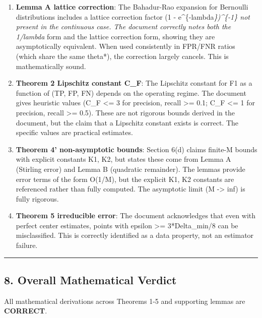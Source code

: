 \documentclass[
  12pt,
]{article}
\begin{document}
\begin{enumerate}
\def\labelenumi{\arabic{enumi}.}
\item
  \textbf{Lemma A lattice correction}: The Bahadur-Rao expansion for
  Bernoulli distributions includes a lattice correction factor (1 -
  e\^{}\{-lambda\emph{\})\^{}\{-1\} not present in the continuous case.
  The document correctly notes both the 1/lambda} form and the lattice
  correction form, showing they are asymptotically equivalent. When used
  consistently in FPR/FNR ratios (which share the same theta*), the
  correction largely cancels. This is mathematically sound.
\item
  \textbf{Theorem 2 Lipschitz constant C\_F}: The Lipschitz constant for
  F1 as a function of (TP, FP, FN) depends on the operating regime. The
  document gives heuristic values (C\_F \textless= 3 for precision,
  recall \textgreater= 0.1; C\_F \textless= 1 for precision, recall
  \textgreater= 0.5). These are not rigorous bounds derived in the
  document, but the claim that a Lipschitz constant exists is correct.
  The specific values are practical estimates.
\item
  \textbf{Theorem 4' non-asymptotic bounds}: Section 6(d) claims
  finite-M bounds with explicit constants K1, K2, but states these come
  from Lemma A (Stirling error) and Lemma B (quadratic remainder). The
  lemmas provide error terms of the form O(1/M), but the explicit K1, K2
  constants are referenced rather than fully computed. The asymptotic
  limit (M -\textgreater{} inf) is fully rigorous.
\item
  \textbf{Theorem 5 irreducible error}: The document acknowledges that
  even with perfect center estimates, points with
  \textbar\textbar epsilon\textbar\textbar{} \textgreater=
  3*Delta\_min/8 can be misclassified. This is correctly identified as a
  data property, not an estimator failure.
\end{enumerate}

\begin{center}\rule{0.5\linewidth}{0.5pt}\end{center}

\subsection{8. Overall Mathematical
Verdict}\label{overall-mathematical-verdict}

All mathematical derivations across Theorems 1-5 and supporting lemmas
are \textbf{CORRECT}.
\end{document}
